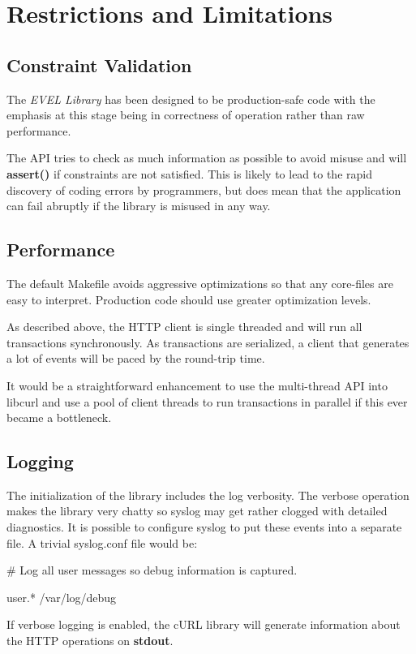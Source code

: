 \section*{Restrictions and Limitations}

\subsection*{Constraint Validation}

The {\itshape E\+V\+EL Library} has been designed to be production-\/safe code with the emphasis at this stage being in correctness of operation rather than raw performance.

The A\+PI tries to check as much information as possible to avoid misuse and will {\bfseries assert()} if constraints are not satisfied. This is likely to lead to the rapid discovery of coding errors by programmers, but does mean that the application can fail abruptly if the library is misused in any way.

\subsection*{Performance}

The default Makefile avoids aggressive optimizations so that any core-\/files are easy to interpret. Production code should use greater optimization levels.

As described above, the H\+T\+TP client is single threaded and will run all transactions synchronously. As transactions are serialized, a client that generates a lot of events will be paced by the round-\/trip time.

It would be a straightforward enhancement to use the multi-\/thread A\+PI into libcurl and use a pool of client threads to run transactions in parallel if this ever became a bottleneck.

\subsection*{Logging}

The initialization of the library includes the log verbosity. The verbose operation makes the library very chatty so syslog may get rather clogged with detailed diagnostics. It is possible to configure syslog to put these events into a separate file. A trivial syslog.\+conf file would be\+:


\begin{DoxyCode}
# Log all user messages so debug information is captured.

user.*      /var/log/debug
\end{DoxyCode}


If verbose logging is enabled, the c\+U\+RL library will generate information about the H\+T\+TP operations on {\bfseries stdout}. 